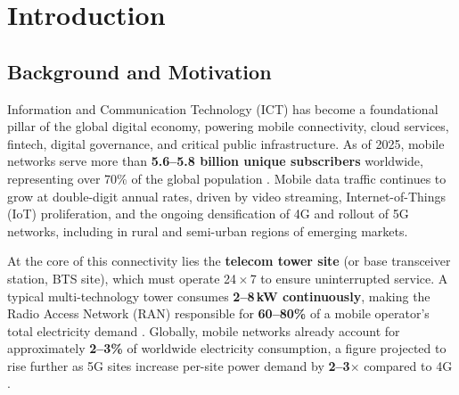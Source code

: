 
\chapter{Introduction}
\label{chap:introduction}

\section{Background and Motivation}

Information and Communication Technology (ICT) has become a foundational
pillar of the global digital economy, powering mobile connectivity, cloud
services, fintech, digital governance, and critical public infrastructure.
As of 2025, mobile networks serve more than \textbf{5.6--5.8 billion unique
subscribers} worldwide, representing over 70\% of the global population
\citep{gsma2025_mobile_economy}. Mobile data traffic continues to grow at
double-digit annual rates, driven by video streaming, Internet-of-Things
(IoT) proliferation, and the ongoing densification of 4G and rollout of 5G
networks, including in rural and semi-urban regions of emerging markets.

At the core of this connectivity lies the \textbf{telecom tower site} (or base
transceiver station, BTS site), which must operate 24\,$\times$\,7 to ensure
uninterrupted service. A typical multi-technology tower consumes
\textbf{2--8\,kW continuously}, making the Radio Access Network (RAN)
responsible for \textbf{60--80\%} of a mobile operator's total electricity
demand \citep{americas2023_energy_efficiency}. Globally, mobile networks
already account for approximately \textbf{2--3\%} of worldwide electricity
consumption, a figure projected to rise further as 5G sites increase per-site
power demand by \textbf{2--3$\times$} compared to 4G
\citep{mckinsey2023_greener_telecom}.

